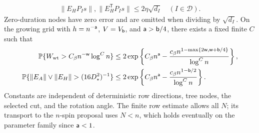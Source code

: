 \begin{lemma}
\begin{equation}
\begin{aligned}
   \|E_HP_Is\|,\|E_H^{\mathsf T}P_Is\|
   \le2\eta\sqrt{d_I}\quad(I\in\mathcal D).
\end{aligned}
\end{equation}
Zero-duration nodes have zero error and are omitted when dividing by
$\sqrt{d_I}$. On the growing grid with $h=n^{-\mathsf{a}}$,
$V=V_{\mathsf{b}}$, and $\mathsf{a}>\mathsf{b}/4$, there exists a fixed finite $C$
such that
\begin{align}
 \PP\{W_{\rm wt}>C_\beta n^{-\ex{w}}\log^C n\}
 &\le2\exp\left\{C_\beta n^{\ex{a}}
 -\frac{c_\beta n^{1-\max\{2\ex{w},\ex{w}+\ex{b}/4\}}}
 {\log^C n}\right\},\label{u:eq:weighted-growing}\\
 \PP\{\|E_A\|\vee\|E_H\|>(16D_*^2)^{-1}\}
 &\le2\exp\left\{C_\beta n^{\ex{a}}
 -\frac{c_\beta n^{1-\ex{b}/2}}{\log^C n}\right\}.
 \label{u:eq:gram-growing}
\end{align}
Constants are independent of deterministic row directions, tree nodes,
the selected cut, and the rotation angle. The finite row estimate allows
all $N$; its transport to the $n$-spin proposal uses $N<n$, which holds
eventually on the parameter family since $\mathsf{a}<1$.
\end{lemma}

